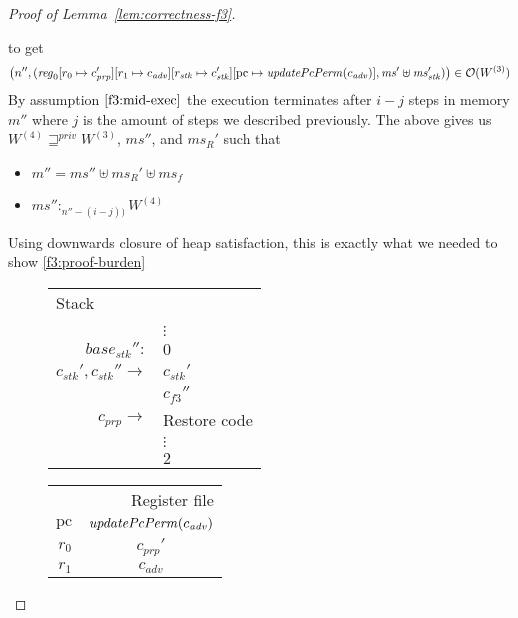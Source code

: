 \documentclass[a4paper]{article}
\newcommand{\update}[2]{[#1 \mapsto #2]}
\newcommand{\var}[1]{\mathit{#1}}
\newcommand{\hs}{\var{ms}}
\newcommand{\ms}{\hs}
\newcommand{\pcreg}{\mathrm{pc}}
\newcommand{\start}{\var{base}}
\newcommand{\reg}{\var{reg}}
\newcommand{\heap}{\var{mem}}
\newcommand{\adv}{\var{adv}}
\newcommand{\stk}{\var{stk}}
\newcommand{\plainfun}[2]{
  \ifthenelse{\equal{#2}{}}
  {\mathit{#1}}
  {\mathit{#1}(#2)}
}
\newcommand{\updatePcPerm}[1]{\plainfun{updatePcPerm}{#1}}
\newcommand{\futurestr}{\mathbin{\sqsupseteq}^{\var{priv}}}
\newcommand{\heapSat}[3][\heap]{#1 :_{#2} #3}
\newcommand{\memSat}[3][n]{\heapSat[#2]{#1}{#3}}
\newcommand{\observations}{\mathcal{O}}
\newcommand{\npair}[2][n]{\left(#1,#2 \right)}
\begin{document}
\begin{proof}[Proof of Lemma~\ref{lem:correctness-f3}]
\begin{enumproof}[start=3]
\begin{enumproof}[start=3]
\begin{enumproof}[resume]
\begin{enumproof}
\begin{enumproof}
          \end{enumproof}
        \end{enumproof}
      \end{enumproof}
      to get
      \[
        \npair[n'']{(\reg_0\update{r_0}{c_{\var{prp}}'}\update{r_1}{c_\adv}\update{r_\stk}{c_\stk'}\update{\pcreg}{\updatePcPerm{c_\adv}},\ms' \uplus \ms_\stk')} \in \observations(W^{(3)})
      \]
      By assumption $\ref{f3:mid-exec}$ the execution terminates after $i-j$ steps in memory $m''$ where $j$ is the amount of steps we described previously. The above gives us $W^{(4)} \futurestr W^{(3)}$, $\ms''$, and $\ms_R'$ such that
      \begin{itemize}
      \item $m'' = \ms'' \uplus \ms_R' \uplus \ms_f$
      \item $\memSat[n''-(i-j))]{\ms''}{W^{(4)}}$
      \end{itemize}
      Using downwards closure of heap satisfaction, this is exactly what we needed to show \ref{f3:proof-burden}
      \begin{figure}
        \centering
        \begin{tabular}[!h]{r | >{\raggedright\arraybackslash}p{3cm} |}
          \multicolumn{2}{l}{Stack} \\
          \cline{2-2}
       &         \\
       & $\vdots$ \\
          \cline{2-2}
          $\start_\stk'':$   & $0$\\
          \cline{2-2}
          $c_\stk',c_\stk'' \rightarrow$   & $c_\stk'$ \\
          \cline{2-2}
       & $c_{f3}''$ \\
          \cline{2-2}
          $c_{\var{prp}} \rightarrow$   & Restore code \\
       & $\vdots$ \\
          \cline{2-2}
       & $2$\\
          \cline{2-2}
        \end{tabular}
        \hspace{1cm}
        \begin{tabular}{r |c |}
          \multicolumn{2}{r}{Register file} \\
          \cline{2-2}
          $\pcreg$ & $\updatePcPerm{c_\adv}$\\
          \cline{2-2}
          $r_0$  &  $c_{\var{prp}}'$ \\
          \cline{2-2}
          $r_1$ & $c_\adv$ \\

\end{tabular}
\end{figure}
\end{enumproof}
\end{enumproof}
\end{proof}
\end{document}
